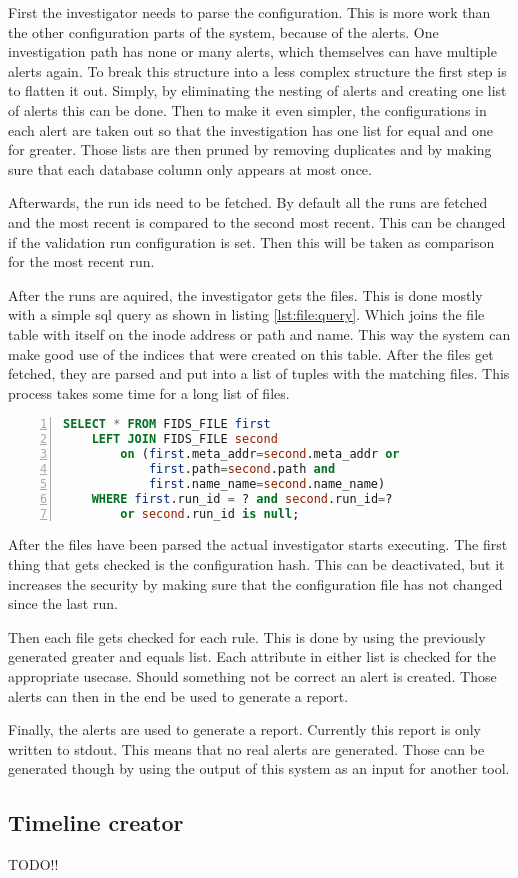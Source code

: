 First the investigator needs to parse the configuration. This is more work than the other configuration parts of the system, because of the alerts. One investigation path has none or many alerts, which themselves can have multiple alerts again. To break this structure into a less complex structure the first step is to flatten it out. Simply, by eliminating the nesting of alerts and creating one list of alerts this can be done. Then to make it even simpler, the configurations in each alert are taken out so that the investigation has one list for equal and one for greater. Those lists are then pruned by removing duplicates and by making sure that each database column only appears at most once. 

Afterwards, the run ids need to be fetched. By default all the runs are fetched and the most recent is compared to the second most recent. This can be changed if the validation run configuration is set. Then this will be taken as comparison for the most recent run.

After the runs are aquired, the investigator gets the files. This is done mostly with a simple sql query as shown in listing \ref{lst:file:query}. Which joins the file table with itself on the inode address or path and name. This way the system can make good use of the indices that were created on this table. After the files get fetched, they are parsed and put into a list of tuples with the matching files. This process takes some time for a long list of files. 

\begin{lstlisting}[language=sql, numbers=left, caption=SQL Querry for files, label=lst:file:query]
SELECT * FROM FIDS_FILE first 
	LEFT JOIN FIDS_FILE second 
		on (first.meta_addr=second.meta_addr or 
			first.path=second.path and 
			first.name_name=second.name_name)
	WHERE first.run_id = ? and second.run_id=? 
		or second.run_id is null;
\end{lstlisting}

After the files have been parsed the actual investigator starts executing. The first thing that gets checked is the configuration hash. This can be deactivated, but it increases the security by making sure that the configuration file has not changed since the last run.

Then each file gets checked for each rule. This is done by using the previously generated greater and equals list. Each attribute in either list is checked for the appropriate usecase. Should something not be correct an alert is created. Those alerts can then in the end be used to generate a report. 

Finally, the alerts are used to generate a report. Currently this report is only written to stdout. This means that no real alerts are generated. Those can be generated though by using the output of this system as an input for another tool.



\subsection{Timeline creator}
\label{sec:Timeliner}

TODO!!